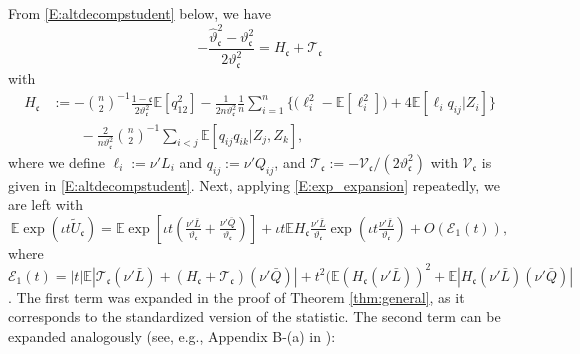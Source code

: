 \documentclass[11pt]{article}
\numberwithin{equation}{section}
\theoremstyle{definition}
\newcommand{\E}{\mathbb{E}}
\newcommand{\Scale}{\vartheta}
\begin{document}
From \eqref{E:altdecompstudent} below, we have
\begin{equation}\label{E:decompostion_AL}
    - \frac{\widehat{\Scale}_\mathfrak{c}^2 - \Scale_\mathfrak{c}^2}{2\Scale_\mathfrak{c}^2} = H_\mathfrak{c} + \mathcal{T}_\mathfrak{c}
\end{equation}
with
\begin{align*}
    H_\mathfrak{c}
      &:= -\binom{n}{2}^{-1} \frac{1-\mathfrak{c}}{2\vartheta_\mathfrak{c}^2} \E[q_{12}^2] - \frac{1}{2n\vartheta_\mathfrak{c}^2} \frac{1}{n}\sum_{i=1}^n \Big\{ \big(\ell_i^2 - \E[\ell_i^2]\big) + 4 \E[\ell_i q_{ij}|Z_i] \Big\}\\
      & \qquad - \frac{2}{n\vartheta_\mathfrak{c}^2} \binom{n}{2}^{-1} \sum_{i<j} \E[q_{ij}q_{ik}|Z_j,Z_k],
\end{align*}
where we define $\ell_i := \nu'L_i$ and $q_{ij} := \nu'Q_{ij}$, and $\mathcal{T}_\mathfrak{c}:= -\mathcal{V}_\mathfrak{c}/(2\vartheta_\mathfrak{c}^2)$ with $\mathcal{V}_\mathfrak{c}$ is given in \eqref{E:altdecompstudent}. Next, applying \eqref{E:exp_expansion} repeatedly, we are left with
\begin{equation}\label{E:expansion_student_1}
    \E\exp( \iota t \widetilde{U}_\mathfrak{c})
      = \E\exp\left[\iota t \left(\tfrac{\nu'\bar{L}}{\Scale_\mathfrak{c}} + \tfrac{\nu'\bar{Q}}{\Scale_\mathfrak{c}}\right)\right] 
        + \iota t\E H_\mathfrak{c} \tfrac{\nu'\bar{L}}{\Scale_\mathfrak{c}}\exp(\iota t\tfrac{\nu'\bar{L}}{\Scale_\mathfrak{c}} ) 
        + O\left(\mathcal{E}_1(t)\right),
\end{equation}
where $\mathcal{E}_1(t)=|t|\E|\mathcal{T}_\mathfrak{c} (\nu'\bar{L}) + (H_\mathfrak{c} + \mathcal{T}_\mathfrak{c})(\nu'\bar{Q})| + t^2(\E(H_\mathfrak{c} (\nu'\bar{L}))^2 + \E|H_\mathfrak{c} (\nu'\bar{L}) (\nu'\bar{Q})|$. The first term was expanded in the proof of Theorem \ref{thm:general}, as it corresponds to the standardized version of the statistic. The second term can be expanded analogously (see, e.g., Appendix B-(a) in \citet{Nishiyama-Robinson_2001_ChBook}): 
\end{document}
